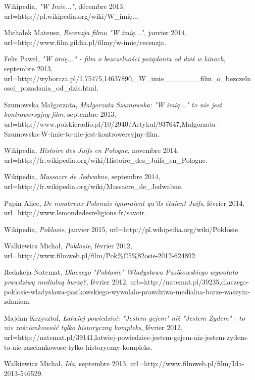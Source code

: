 \documentclass[12pt, twocolumn]{amsart}
\begin{document}
\begin{thebibliography}{100}
	Wikipedia,
	\emph{"W Imie..."},
	décembre 2013,
	url=http://pl.wikipedia.org/wiki/W\_imię...

	Michałek Mateusz,
	\emph{Recenzja filmu "W imię..."},
	janvier 2014,
	url=http://www.film.gildia.pl/filmy/w-imie/recenzja.

	Felis Paweł,
	\emph{"W imię..." - film o bezczelności pożądania od dziś w kinach},
	septembre 2013,
	url=http://wyborcza.pl/1,75475,14637890,\_W\_imie\_\_\_\_\_\_\_film\_o\_bezczelnosci\_pozadania\_od\_dzis.html.


	Szumowska Małgorzata,
	\emph{Małgorzata Szumowska: "W imię..." to nie jest kontrowersyjny film},
	septembre 2013,
	url=http://www.polskieradio.pl/10/2940/Artykul/937647,Malgorzata-Szumowska-W-imie-to-nie-jest-kontrowersyjny-film.

	Wikipedia,
	\emph{Histoire des Juifs en Pologne},
	novembre 2014,
	url=http://fr.wikipedia.org/wiki/Histoire\_des\_Juifs\_en\_Pologne.


	Wikipedia,
	\emph{Massacre de Jedwabne},
	septembre 2014,
	url=http://fr.wikipedia.org/wiki/Massacre\_de\_Jedwabne.

	Papin Alice,
	\emph{De nombreux Polonais ignoraient qu'ils étaient Juifs},
	février 2014,
	url=http://www.lemondedesreligions.fr/savoir.

	Wikipedia,
	\emph{Poklosie},
	janvier 2015,
	url=http://pl.wikipedia.org/wiki/Pokłosie.

	Walkiewicz Michał,
	\emph{Pokłosie},
	février 2012,
	url=http://www.filmweb.pl/film/Pok\%C5\%82osie-2012-624892.

	Redakcja Natemat,
	\emph{Dlaczego "Pokłosie" Władysława Pasikowskiego wywołało prawdziwą medialną burzę?},
	février 2012,
	url=http://natemat.pl/39235,dlaczego-poklosie-wladyslawa-pasikowskiego-wywolalo-prawdziwa-medialna-burze-waszym-zdaniem.

	Majdan Krzysztof,
	\emph{Łatwiej powiedzieć: "Jestem gejem" niż "Jestem Żydem" - to nie zaściankowość tylko historyczny kompleks},
	février 2012,
	url=http://natemat.pl/39141,latwiej-powiedziec-jestem-gejem-niz-jestem-zydem-to-nie-zasciankowosc-tylko-historyczny-kompleks.

	Walkiewicz Michał,
	\emph{Ida},
	septembre 2013,
	url=http://www.filmweb.pl/film/Ida-2013-546529.


\end{thebibliography}
\end{document}
